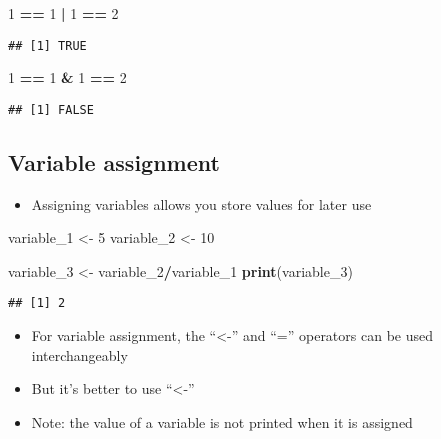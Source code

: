 \documentclass[]{article}
\newenvironment{Shaded}{\begin{snugshade}}{\end{snugshade}}
\newcommand{\KeywordTok}[1]{\textcolor[rgb]{0.13,0.29,0.53}{\textbf{#1}}}
\newcommand{\DecValTok}[1]{\textcolor[rgb]{0.00,0.00,0.81}{#1}}
\newcommand{\StringTok}[1]{\textcolor[rgb]{0.31,0.60,0.02}{#1}}
\newcommand{\OperatorTok}[1]{\textcolor[rgb]{0.81,0.36,0.00}{\textbf{#1}}}
\newcommand{\NormalTok}[1]{#1}
\providecommand{\tightlist}{%
  \setlength{\itemsep}{0pt}\setlength{\parskip}{0pt}}
\begin{document}
\begin{Shaded}
\begin{Highlighting}[]
\DecValTok{1} \OperatorTok{==}\StringTok{ }\DecValTok{1} \OperatorTok{|}\StringTok{ }\DecValTok{1} \OperatorTok{==}\StringTok{ }\DecValTok{2}
\end{Highlighting}
\end{Shaded}

\begin{verbatim}
## [1] TRUE
\end{verbatim}

\begin{Shaded}
\begin{Highlighting}[]
\DecValTok{1} \OperatorTok{==}\StringTok{ }\DecValTok{1} \OperatorTok{&}\StringTok{ }\DecValTok{1} \OperatorTok{==}\StringTok{ }\DecValTok{2}
\end{Highlighting}
\end{Shaded}

\begin{verbatim}
## [1] FALSE
\end{verbatim}

\subsection{Variable assignment}\label{variable-assignment}

\begin{itemize}
\tightlist
\item
  Assigning variables allows you store values for later use
\end{itemize}

\begin{Shaded}
\begin{Highlighting}[]
\NormalTok{variable_}\DecValTok{1}\NormalTok{ <-}\StringTok{ }\DecValTok{5}
\NormalTok{variable_}\DecValTok{2}\NormalTok{ <-}\StringTok{ }\DecValTok{10}

\NormalTok{variable_}\DecValTok{3}\NormalTok{ <-}\StringTok{ }\NormalTok{variable_}\DecValTok{2}\OperatorTok{/}\NormalTok{variable_}\DecValTok{1}
\KeywordTok{print}\NormalTok{(variable_}\DecValTok{3}\NormalTok{)}
\end{Highlighting}
\end{Shaded}

\begin{verbatim}
## [1] 2
\end{verbatim}

\begin{itemize}
\tightlist
\item
  For variable assignment, the ``\textless{}-'' and ``='' operators can
  be used interchangeably
\item
  But it's better to use ``\textless{}-''
\item
  Note: the value of a variable is not printed when it is assigned
\end{itemize}
\end{document}
